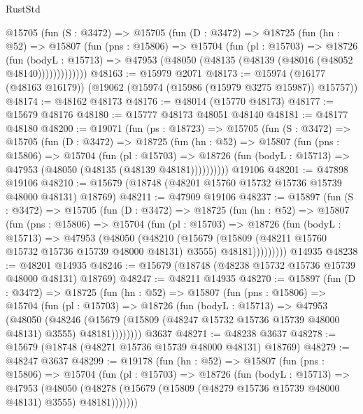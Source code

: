 \begin{lexlean}{RustStd}
\begin{coremodule}
      @15705
        (fun (S : @3472) =>
        @15705
          (fun (D : @3472) =>
          @18725
            (fun (hn : @52) =>
            @15807
              (fun (pns : @15806) =>
              @15704
                (fun (pl : @15703) =>
                @18726
                  (fun (bodyL : @15713) =>
                  @47953 (@48050 (@48135 (@48139 (@48016 (@48052 @48140)))))))))))))
@48163 := @15979 @2071
@48173 := @15974 (@16177 (@48163 @16179)) (@19062 (@15974 (@15986 (@15979 @3275 @15987)) @15757))
@48174 := @48162 @48173
@48176 := @48014 (@15770 @48173)
@48177 := @15679 @48176
@48180 := @15777 @48173 @48051 @48140
@48181 := @48177 @48180
@48200 := @19071
    (fun (ps : @18723) =>
    @15705
      (fun (S : @3472) =>
      @15705
        (fun (D : @3472) =>
        @18725
          (fun (hn : @52) =>
          @15807
            (fun (pns : @15806) =>
            @15704
              (fun (pl : @15703) =>
              @18726 (fun (bodyL : @15713) => @47953 (@48050 (@48135 (@48139 @48181))))))))))
    @19106
@48201 := @47898 @19106
@48210 := @15679 (@18748 (@48201 @15760 @15732 @15736 @15739 @48000 @48131) @18769)
@48211 := @47909 @19106
@48237 := @15897
    (fun (S : @3472) =>
    @15705
      (fun (D : @3472) =>
      @18725
        (fun (hn : @52) =>
        @15807
          (fun (pns : @15806) =>
          @15704
            (fun (pl : @15703) =>
            @18726
              (fun (bodyL : @15713) =>
              @47953
                (@48050
                  (@48210
                    (@15679
                      (@15809 (@48211 @15760 @15732 @15736 @15739 @48000 @48131) @3555)
                      @48181)))))))))
    @14935
@48238 := @48201 @14935
@48246 := @15679 (@18748 (@48238 @15732 @15736 @15739 @48000 @48131) @18769)
@48247 := @48211 @14935
@48270 := @15897
    (fun (D : @3472) =>
    @18725
      (fun (hn : @52) =>
      @15807
        (fun (pns : @15806) =>
        @15704
          (fun (pl : @15703) =>
          @18726
            (fun (bodyL : @15713) =>
            @47953
              (@48050
                (@48246
                  (@15679 (@15809 (@48247 @15732 @15736 @15739 @48000 @48131) @3555) @48181))))))))
    @3637
@48271 := @48238 @3637
@48278 := @15679 (@18748 (@48271 @15736 @15739 @48000 @48131) @18769)
@48279 := @48247 @3637
@48299 := @19178
    (fun (hn : @52) =>
    @15807
      (fun (pns : @15806) =>
      @15704
        (fun (pl : @15703) =>
        @18726
          (fun (bodyL : @15713) =>
          @47953
            (@48050
              (@48278 (@15679 (@15809 (@48279 @15736 @15739 @48000 @48131) @3555) @48181)))))))

\end{coremodule}
\end{lexlean}
